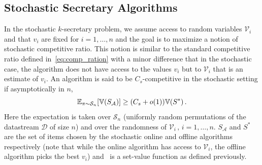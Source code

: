 \subsection{Stochastic Secretary Algorithms}
\label{stochastic_secretary_algorithms_section}
In the stochastic $k$-secretary problem, we assume access to random variables $\mathcal{V}_i$ and that $v_i$ are fixed for $i = 1, \ldots,n$ and the goal is to maximize a notion of stochastic competitive ratio. This notion is similar to the standard competitive ratio defined in~\eqref{eq:comp_ration} with a minor difference that in the stochastic case, the algorithm does not have access to the values $v_i$ but to $\mathcal{V}_i$ that is an estimate of $v_i$. An algorithm is said to be $C_s$-competitive in the stochastic setting if asymptotically in $n$,
\begin{equation*}
    \mathbb{E}_{\pi \sim \mathcal{S}_n}[\mathbb{V}(S_{\mathcal{A}})] \geq ( C_s + o(1)) \mathbb{V}(S^*) \,.
    \label{eq:sto_comp_ration}
\end{equation*}
Here the expectation is taken over $\mathcal{S}_n$ (uniformly random permutations of the datastream $\mathcal{D}$ of size $n$) and over the randomness of $\mathcal{V}_i\,,\,i=1,\ldots,n$. $S_{\mathcal{A}}$ and $S^*$ are the set of items chosen by the stochastic online and offline algorithms respectively (note that while the online algorithm has access to $\mathcal{V}_i$, the offline algorithm picks the best $v_i$) and \setvalue\ is a set-value function as defined previously. %






